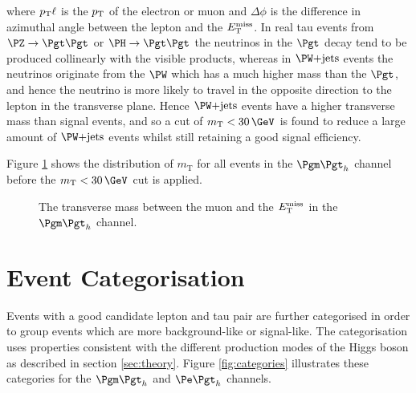 where $p_{\mathrm{T}}{\ell}$ is the $p_{\mathrm{T}}$ of the electron or muon and $\Delta\phi$ is the
difference in azimuthal angle between the lepton and the $E_{\mathrm{T}}^{\text{miss}}$. In real tau
events from $\PZ\to\Pgt\Pgt$ or $\PH\to\Pgt\Pgt$ the neutrinos in the $\Pgt$
decay tend to be produced collinearly with the visible products, whereas in
$\WJets$ events the neutrinos originate from the $\PW$ which has a much higher
mass than the $\Pgt$, and hence the neutrino is more likely to travel in the
opposite direction to the lepton in the transverse plane. Hence $\WJets$ events
have a higher transverse mass than signal events, and so a cut of
$m_{\text{T}}<30\,\GeV$ is found to reduce a large amount of $\WJets$ events
whilst still retaining a good signal efficiency.

Figure \ref{fig:transversemass} shows the distribution of $m_{\text{T}}$ for all
events in the $\mutau$ channel before the $m_{\text{T}}<30\,\GeV$ cut is
applied.

\begin{figure}[htb]
\begin{center}

\end{center}
\caption{
 The transverse mass between the muon and the $E_{\mathrm{T}}^{\text{miss}}$ in the $\mutau$ channel.  
}
\label{fig:transversemass}
\end{figure}


\section{Event Categorisation}
\label{sec:eventcategorisation}

Events with a good candidate lepton and tau pair are further categorised in
order to group events which are more background-like or signal-like. The
categorisation uses properties consistent with the different production modes of
the Higgs boson as described in section \ref{sec:theory}. Figure
\ref{fig:categories} illustrates these categories for the $\mutau$ and $\etau$
channels.

